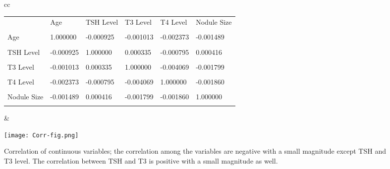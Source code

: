 \documentclass[11pt,a4paper]{article}
\begin{document}
\begin{figure}[H]
\begin{tabular}{cc}
    \begin{minipage}{.45\linewidth}
		\begin{tabular}{|l|l|l|l|l|l|} \hline
	              & Age          & TSH Level   & T3 Level    & T4 Level    & Nodule Size \\ 
	              &              &             &             &             &             \\\hline
Age               & 1.000000     & -0.000925   & -0.001013   & -0.002373   & -0.001489 \\
	              &              &             &             &             &             \\\hline
TSH Level         & -0.000925    & 1.000000    & 0.000335    & -0.000795   & 0.000416 \\
	              &              &             &             &             &             \\\hline
T3 Level          & -0.001013    & 0.000335    & 1.000000    & -0.004069   & -0.001799 \\
	              &              &             &             &             &             \\\hline
T4 Level          & -0.002373    & -0.000795   & -0.004069   & 1.000000    & -0.001860 \\
	              &              &             &             &             &             \\\hline
Nodule Size       & -0.001489    & 0.000416    & -0.001799   & -0.001860   & 1.000000 \\
	              &              &             &             &             &             \\\hline
\end{tabular}
    \end{minipage} & \hspace{2.7cm}
\begin{minipage}{.45\linewidth}
\texttt{[image: Corr-fig.png]}
\end{minipage}
\end{tabular}
\caption{Correlation of continuous variables; the correlation among the variables are negative with a small magnitude except TSH and T3 level. The correlation between TSH and T3 is positive with a small magnitude as well.}\label{corr}
\end{figure}

\newpage
\end{document}

